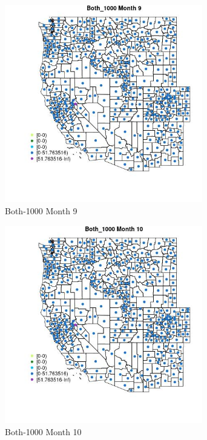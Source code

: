 \begin{figure} 
\centering  
\includegraphics[width=0.77\textwidth]{Code_Outputs/df_report_ML_predictors_CountyCentroid_Locations_Dates_2008-01-01to2018-12-31_MapObsMo9Both_1000.jpg} 
\caption{\label{fig:df_report_ML_predictors_CountyCentroid_Locations_Dates_2008-01-01to2018-12-31MapObsMo9Both_1000}Both-1000 Month 9} 
\end{figure} 
 

\clearpage 

\begin{figure} 
\centering  
\includegraphics[width=0.77\textwidth]{Code_Outputs/df_report_ML_predictors_CountyCentroid_Locations_Dates_2008-01-01to2018-12-31_MapObsMo10Both_1000.jpg} 
\caption{\label{fig:df_report_ML_predictors_CountyCentroid_Locations_Dates_2008-01-01to2018-12-31MapObsMo10Both_1000}Both-1000 Month 10} 
\end{figure} 
 

